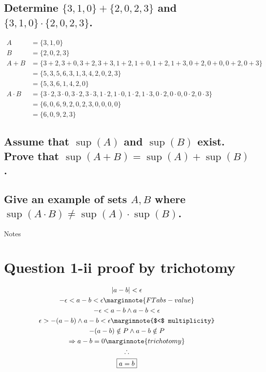 \documentclass[letterpaper]{article}
\begin{document}
\subsection{Determine $\{3,1,0\}+\{2,0,2,3\}$ and $\{3,1,0\}\cdot\{2,0,2,3\}$.}
\begin{align*}
A&=\{3,1,0\} \\
B&=\{2,0,2,3\} \\
A+B&=\{3+2,3+0,3+2,3+3,1+2,1+0,1+2,1+3,0+2,0+0,0+2,0+3\} \\
&=\{5,3,5,6,3,1,3,4,2,0,2,3\} \\
&=\{5,3,6,1,4,2,0\} \\
A\cdot B&= \{3\cdot 2,3\cdot 0,3\cdot 2,3\cdot 3,1\cdot 2,1\cdot 0,1\cdot 2,1\cdot 3,0\cdot 2,0\cdot 0,0\cdot 2,0\cdot 3\} \\
&=\{6,0,6,9,2,0,2,3,0,0,0,0\} \\
&=\{6,0,9,2,3\}
\end{align*}
\subsection{Assume that $\sup(A)$ and $\sup(B)$ exist. Prove that $\sup(A+B)=\sup(A)+\sup(B)$.}
\subsection{Give an example of sets $A,B$ where $\sup(A\cdot B)\neq\sup(A)\cdot\sup(B)$.}
\pagebreak
\setcounter{section}{0}

\begin{center}\Large{Notes}\end{center}

\section{Question 1-ii proof by trichotomy}
\begin{gather*}
|a-b|<\epsilon \\
-\epsilon < a-b < \epsilon \marginnote{FT abs-value} \\
-\epsilon < a-b \land a-b < \epsilon \\
\epsilon > -(a-b) \land a-b < \epsilon \marginnote{$<$ multiplicity} \\
-(a-b) \notin P \land a-b \notin P \\
\Rightarrow a-b=0 \marginnote{trichotomy} \\
\therefore \\
\boxed{a = b}
\end{gather*}
\end{document}
